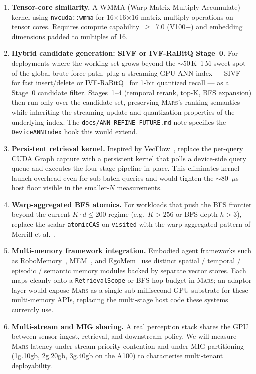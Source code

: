 \documentclass[11pt]{article}
\newcommand{\mars}{\textsc{Mars}}
\begin{document}
\begin{enumerate}
\item \textbf{Tensor-core similarity.} A WMMA (Warp Matrix
  Multiply-Accumulate) kernel using \texttt{nvcuda::wmma} for
  16$\times$16$\times$16 matrix multiply operations on tensor cores.
  Requires compute capability~$\geq$~7.0 (V100+) and embedding
  dimensions padded to multiples of 16.

\item \textbf{Hybrid candidate generation: SIVF or IVF-RaBitQ Stage~0.}
  For deployments where the working set grows beyond the
  ${\sim}50$\,K--1\,M sweet spot of the global brute-force path,
  plug a streaming GPU ANN index --- SIVF~\cite{sivf} for fast
  insert/delete or IVF-RaBitQ~\cite{ivf_rabitq_gpu} for 1-bit
  quantized recall --- as a Stage~0 candidate filter. Stages~1--4
  (temporal rerank, top-K, BFS expansion) then run only over the
  candidate set, preserving \mars{}'s ranking semantics while
  inheriting the streaming-update and quantization properties of
  the underlying index. The
  \texttt{docs/ANN\_REFINE\_FUTURE.md} note specifies the
  \texttt{DeviceANNIndex} hook this would extend.

\item \textbf{Persistent retrieval kernel.} Inspired by
  VecFlow~\cite{vecflow}, replace the per-query CUDA Graph capture
  with a persistent kernel that polls a device-side query queue and
  executes the four-stage pipeline in-place. This eliminates kernel
  launch overhead even for sub-batch queries and would tighten the
  ${\sim}80$~$\mu$s host floor visible in the smaller-$N$
  measurements.

\item \textbf{Warp-aggregated BFS atomics.} For workloads that push
  the BFS frontier beyond the current $K \cdot \bar{d} \le 200$
  regime (e.g.\ $K{>}256$ or BFS depth $h{>}3$), replace the scalar
  \texttt{atomicCAS} on \texttt{visited} with the warp-aggregated
  pattern of Merrill et al.~\cite{merrill2012}.

\item \textbf{Multi-memory framework integration.} Embodied agent
  frameworks such as RoboMemory~\cite{robomemory},
  MEM~\cite{mem_pi06}, and EgoMem~\cite{egomem} use distinct
  spatial / temporal / episodic / semantic memory modules backed by
  separate vector stores. Each maps cleanly onto a
  \texttt{RetrievalScope} or BFS hop budget in \mars{}; an adaptor
  layer would expose \mars{} as a single sub-millisecond GPU
  substrate for these multi-memory APIs, replacing the multi-stage
  host code these systems currently use.

\item \textbf{Multi-stream and MIG sharing.} A real perception stack
  shares the GPU between sensor ingest, retrieval, and downstream
  policy. We will measure \mars{} latency under stream-priority
  contention and under MIG partitioning (1g.10gb, 2g.20gb, 3g.40gb
  on the A100) to characterise multi-tenant deployability.
\end{enumerate}
\end{document}
